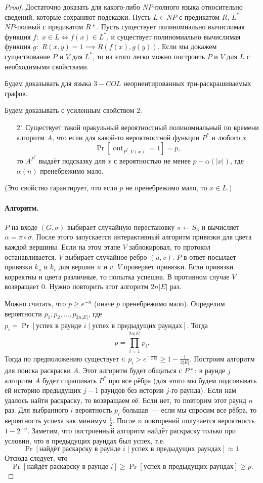 \documentclass[12pt,a4paper]{article}
\newcommand{\seqn}[2]{{#1}_1,{#1}_2,\dotsc,{#1}_{#2}}
\DeclareMathOperator{\out}{out}
\theoremstyle{definition}
\theoremstyle{plain}
\theoremstyle{remark}
\begin{document}
\begin{proof}
Достаточно доказать для какого-либо $NP$-полного языка относительно сведений,
которые сохраняют подсказки. 
Пусть $L\in NP$ с предикатом $R$,
$L^*$~--- $NP$-полный с предикатом $R*$. Пусть существует полиномиально вычислимая функция $f:$
$x\in L \iff f(x)\in L^*$,
и существует полиномиально вычислимая функция $g:$
$R(x,y) = 1 \implies R(f(x), g(y))$.
Если мы докажем существование $P$ и $V$ для $L^*$, то из этого легко можно построить $P$ и $V$ для $L$ с необходимыми свойствами.

Будем доказывать для языка $3-COL$ неориентированных три-раскрашиваемых графов.

Будем доказывать с усиленным свойством 2.
{\em
\begin{itemize}
\item[2'.] Существует такой оракульный вероятностный полиномиальный по времени алгоритм $A$, что если для какой-то вероятностной функции $P^*$ и любого $x$
$$
\Pr[\out_{P^*,V(x)} = 1] = p,
$$
то $A^{P^*}$ выдаёт подсказку для $x$ 
с вероятностью не менее $p - \alpha(|x|)$,
где $\alpha(n)$ пренебрежимо мало.
\end{itemize}}
(Это свойство гарантирует, что если $p$ не пренебрежимо мало, то $x\in L$.)

\paragraph{Алгоритм.} $P$ на входе $(G,\sigma)$ выбирает случайную
перестановку $\pi\gets S_3$ и вычисляет
$\alpha = \pi\circ\sigma$. После этого
запускается интерактивный алгоритм привязки для цвета каждой вершины. Если
на этом этапе $V$ заблокировал, то протокол останавливается. 
$V$ выбирает случайное ребро $(u,v)$.
$P$ в ответ посылает привязки $k_u$ и
$k_v$ для вершин $u$ и $v$.
$V$ проверяет привязки. Если привязки корректны и цвета различные, то попытка успешна. В противном случае $V$ возвращает $0$. Нужно повторить этот алгоритм $2n|E|$ раз.

Можно считать, что $p\ge e^{-n}$ (иначе $p$ пренебрежимо мало). Определим вероятности $\seqn{p}{2n|E|}$, где $p_i = \Pr[\text{успех в раунде $i$}\mid \text{успех в предыдущих раундах}].$ Тогда $$p=\prod_{i=1}^{2n|E|} p_i.$$
Тогда по предположению существует $i$: $p_i> e^{-\frac1{2|E|}}\ge 1 - \frac1{2|E|}$.
Построим алгоритм для поиска раскраски $A$. Этот алгоритм будет общаться с $P*$:
в раунде $j$ алгоритм $A$ будет спрашивать $P^*$ про все рёбра (для этого мы будем
подсовывать ей историю предыдущих $j-1$ раундов без истории $j$-го раунда).
Если нам удалось найти раскраску, то возвращаем её. Если нет, то повторим этот раунд $n$ раз. Для выбранного $i$ вероятность $p_i$ большая~--- если мы спросим все рёбра, то вероятность успеха как минимум $\frac{1}{2}$. После $n$ повторений получается вероятность $1-2^{-n}$. Заметим, что построенный алгоритм найдёт раскраску только при условии, что в предыдущих раундах был успех, т.е. 
$$
\Pr[\text{найдёт раскарску в раунде $i$}\mid \text{успех в предыдущих раундах}] \approx 1.
$$
Отсюда следует, что 
\[
\Pr[\text{найдёт раскарску в раунде $i$}] \ge \Pr[\text{успех в предыдущих раундах}] \ge p.
\]



\end{proof}
\end{document}
